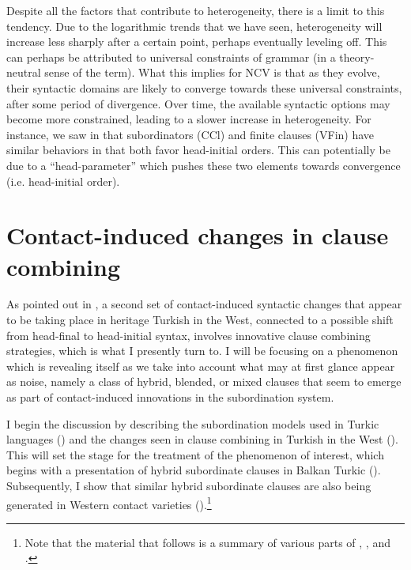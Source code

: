\documentclass[output=paper,colorlinks,citecolor=brown]{langscibook}
\begin{document}
Despite all the factors that contribute to heterogeneity, there is a limit to this tendency. Due to the logarithmic trends that we have seen, heterogeneity will increase less sharply after a certain point, perhaps eventually leveling off. This can perhaps be attributed to universal constraints of grammar (in a theory\hyp neutral sense of the term). What this implies for NCV is that as they evolve, their syntactic domains are likely to converge towards these universal constraints, after some period of divergence. Over time, the available syntactic options may become more constrained, leading to a slower increase in heterogeneity. For instance, we saw in  that subordinators (CCl) and finite clauses (VFin) have similar behaviors in that both favor head-initial orders. This can potentially be due to a ``head-parameter'' which pushes these two elements towards convergence (i.e. head-initial order).

\section{Contact-induced changes in clause combining}
\label{sec:keskin:clause_comb}

As pointed out in , a second set of contact-induced syntactic changes that appear to be taking place in heritage Turkish in the West, connected to a possible shift from head-final to head-initial syntax, involves innovative clause combining strategies, which is what I presently turn to. I will be focusing on a phenomenon which is revealing itself as we take into account what may at first glance appear as noise, namely a class of hybrid, blended, or mixed clauses that seem to emerge as part of contact-induced innovations in the subordination system. 

I begin the discussion by describing the subordination models used in Turkic languages () and the changes seen in clause combining in Turkish in the West (). This will set the stage for the treatment of the phenomenon of interest, which begins with a presentation of hybrid subordinate clauses in Balkan Turkic (). Subsequently, I show that similar hybrid subordinate clauses are also being generated in Western contact varieties ().\footnote{Note that the material that follows is a summary of various parts of \citet{Iefremenko.Keskin.Kornfilt.Schroeder.FACT}, \citet{Keskin.transientBT}, and \citet{Keskinetal.combining}.}
\end{document}
